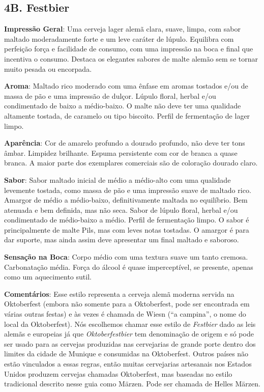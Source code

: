 \subsection*{4B. Festbier}
\textbf{Impressão Geral}: Uma cerveja lager alemã clara, suave, limpa, com sabor maltado moderadamente forte e um leve caráter de lúpulo. Equilibra com perfeição força e facilidade de consumo, com uma impressão na boca e final que incentiva o consumo. Destaca os elegantes sabores de malte alemão sem se tornar muito pesada ou encorpada.

\textbf{Aroma}: Maltado rico moderado com uma ênfase em aromas tostados e/ou de massa de pão e uma impressão de dulçor. Lúpulo floral, herbal e/ou condimentado de baixo a médio-baixo. O malte não deve ter uma qualidade altamente tostada, de caramelo ou tipo biscoito. Perfil de fermentação de lager limpo.

\textbf{Aparência}: Cor de amarelo profundo a dourado profundo, não deve ter tons âmbar. Limpidez brilhante. Espuma persistente com cor de branca a quase branca. A maior parte dos exemplares comerciais são de coloração dourado claro.

\textbf{Sabor}: Sabor maltado inicial de médio a médio-alto com uma qualidade levemente tostada, como massa de pão e uma impressão suave de maltado rico. Amargor de médio a médio-baixo, definitivamente maltada no equilíbrio. Bem atenuada e bem definida, mas não seca. Sabor de lúpulo floral, herbal e/ou condimentado de médio-baixo a médio. Perfil de fermentação limpo. O sabor é principalmente de malte Pils, mas com leves notas tostadas. O amargor é para dar suporte, mas ainda assim deve apresentar um final maltado e saboroso.

\textbf{Sensação na Boca}: Corpo médio com uma textura suave um tanto cremosa. Carbonatação média. Força do álcool é quase imperceptível, se presente, apenas como um aquecimento sutil.

\textbf{Comentários}: Esse estilo representa a cerveja alemã moderna servida na Oktoberfest (embora não somente para a Oktoberfest, pode ser encontrada em várias outras festas) e às vezes é chamada de Wiesn (“a campina”, o nome do local da Oktoberfest). Nós escolhemos chamar esse estilo de \textit{Festbier} dado as leis alemãs e europeias já que \textit{Oktoberfestbier} tem denominação de origem e só pode ser usado para as cervejas produzidas nas cervejarias de grande porte dentro dos limites da cidade de Munique e consumidas na Oktoberfest. Outros países não estão vinculados a essas regras, então muitas cervejarias artesanais nos Estados Unidos produzem cervejas chamadas Oktoberfest, mas baseadas no estilo tradicional descrito nesse guia como Märzen. Pode ser chamada de Helles Märzen.

